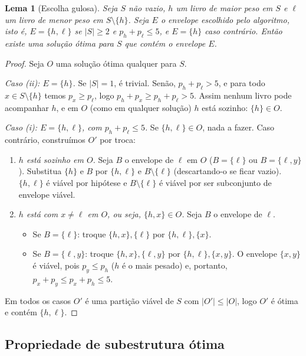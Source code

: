 \documentclass[11pt,a4paper]{article}
\newtheorem{lema}{Lema}
\begin{document}
\begin{lema}[Escolha gulosa]
Seja $S$ não vazio, $h$ um livro de maior peso em $S$ e $\ell$ um livro de menor
peso em $S \setminus \{h\}$. Seja $E$ o envelope escolhido pelo algoritmo, isto é,
$E=\{h,\ell\}$ se $|S|\ge 2$ e $p_h+p_\ell\le 5$, e $E=\{h\}$ caso contrário.
Então existe uma solução ótima para $S$ que contém o envelope $E$.
\end{lema}

\begin{proof}
Seja $O$ uma solução ótima qualquer para $S$.

\smallskip\noindent\emph{Caso (ii): $E = \{h\}$.} Se $|S|=1$, é trivial. Senão,
$p_h + p_\ell > 5$, e para todo $x \in S\setminus\{h\}$ temos $p_x \ge p_\ell$, logo
$p_h + p_x \ge p_h + p_\ell > 5$. Assim nenhum livro pode acompanhar $h$, e em
$O$ (como em qualquer solução) $h$ está sozinho: $\{h\} \in O$.

\smallskip\noindent\emph{Caso (i): $E = \{h,\ell\}$, com $p_h+p_\ell \le 5$.}
Se $\{h,\ell\}\in O$, nada a fazer. Caso contrário, construímos $O'$ por troca:
\begin{enumerate}
  \item \emph{$h$ está sozinho em $O$.} Seja $B$ o envelope de $\ell$ em $O$
    ($B=\{\ell\}$ ou $B=\{\ell,y\}$). Substitua $\{h\}$ e $B$ por $\{h,\ell\}$ e
    $B\setminus\{\ell\}$ (descartando-o se ficar vazio). $\{h,\ell\}$ é viável por
    hipótese e $B\setminus\{\ell\}$ é viável por ser subconjunto de envelope viável.
  \item \emph{$h$ está com $x \ne \ell$ em $O$, ou seja, $\{h,x\} \in O$.}
    Seja $B$ o envelope de $\ell$.
    \begin{itemize}
      \item Se $B=\{\ell\}$: troque $\{h,x\},\{\ell\}$ por $\{h,\ell\},\{x\}$.
      \item Se $B=\{\ell,y\}$: troque $\{h,x\},\{\ell,y\}$ por $\{h,\ell\},\{x,y\}$.
        O envelope $\{x,y\}$ é viável, pois $p_y \le p_h$ ($h$ é o mais pesado) e,
        portanto, $p_x + p_y \le p_x + p_h \le 5$.
    \end{itemize}
\end{enumerate}
Em todos os casos $O'$ é uma partição viável de $S$ com $|O'| \le |O|$, logo
$O'$ é ótima e contém $\{h,\ell\}$.
\end{proof}

\subsection{Propriedade de subestrutura ótima}
\end{document}
